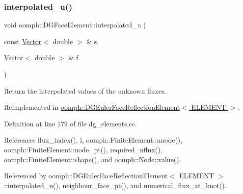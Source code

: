 \mbox{\label{classoomph_1_1DGFaceElement_ab58cee592775f0ae54ac0b0087eb9d35}} 
\subsubsection{\texorpdfstring{interpolated\+\_\+u()}{interpolated\_u()}}
{\footnotesize\ttfamily void oomph\+::\+D\+G\+Face\+Element\+::interpolated\+\_\+u (\begin{DoxyParamCaption}\item[{const \hyperlink{classoomph_1_1Vector}{Vector}$<$ double $>$ \&}]{s,  }\item[{\hyperlink{classoomph_1_1Vector}{Vector}$<$ double $>$ \&}]{f }\end{DoxyParamCaption})\hspace{0.3cm}{\ttfamily [virtual]}}



Return the interpolated values of the unknown fluxes. 



Reimplemented in \hyperlink{classoomph_1_1DGEulerFaceReflectionElement_a288fa54f9022aac4bf060ca19a0c8a67}{oomph\+::\+D\+G\+Euler\+Face\+Reflection\+Element$<$ E\+L\+E\+M\+E\+N\+T $>$}.



Definition at line 179 of file dg\+\_\+elements.\+cc.



References flux\+\_\+index(), i, oomph\+::\+Finite\+Element\+::nnode(), oomph\+::\+Finite\+Element\+::node\+\_\+pt(), required\+\_\+nflux(), oomph\+::\+Finite\+Element\+::shape(), and oomph\+::\+Node\+::value().



Referenced by oomph\+::\+D\+G\+Euler\+Face\+Reflection\+Element$<$ E\+L\+E\+M\+E\+N\+T $>$\+::interpolated\+\_\+u(), neighbour\+\_\+face\+\_\+pt(), and numerical\+\_\+flux\+\_\+at\+\_\+knot().

\mbox{\label{classoomph_1_1DGFaceElement_aef1ba8459a58727387d5217daed72a41}} 
